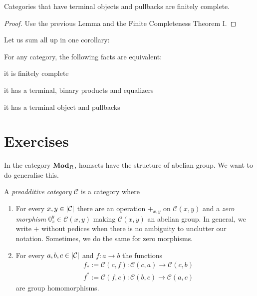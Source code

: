 \begin{proposition}
  Categories that have terminal objects and pullbacks are finitely
  complete.
\end{proposition}

\begin{proof}
  Use the previous Lemma and the Finite Completeness Theorem I.
\end{proof}

Let us sum all up in one corollary:

\begin{corollary}
  For any category, the following facts are equivalent:
  \begin{tcbenum}
  \item it is finitely complete
  \item it has a terminal, binary products and equalizers
  \item it has a terminal object and pullbacks
  \end{tcbenum}
\end{corollary}



\section{Exercises}

In the category \(\mathbf{Mod}_R\), homsets have the structure of abelian
group. We want to do generalise this.

\begin{definition}
  A {\em preadditive category} \(\mathcal{C}\) is a category where
  \begin{enumerate}[leftmargin=*]
  \item For every \(x, y \in \left\lvert\mathcal{C}\right\rvert\) there are an operation
    \(+_{x, y}\) on \(\mathcal{C}(x, y)\) and a {\em zero morphism}
    \(0_x^y \in \mathcal{C}(x, y)\) making \(\mathcal{C}(x, y)\) an abelian group. In general,
    we write \(+\) without pedices when there is no ambiguity to
    unclutter our notation. Sometimes, we do the same for zero
    morphisms.
  \item For every \(a, b, c \in \left\lvert\mathcal{C}\right\rvert\) and \(f : a \to b\) the functions
    \begin{align*}
      & f_\ast := \mathcal{C} (c, f) : \mathcal{C}(c, a) \to \mathcal{C}(c, b) \\
      & f^\ast := \mathcal{C} (f, c) : \mathcal{C}(b, c) \to \mathcal{C}(a, c)
    \end{align*}
    are group homomorphisms.
  \end{enumerate}
\end{definition}

